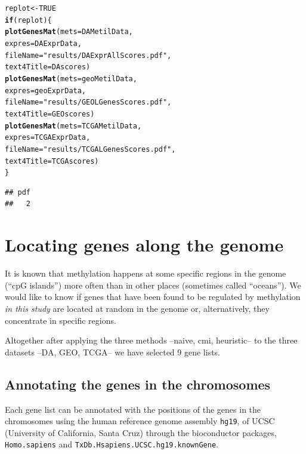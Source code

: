 \documentclass[a4paper,10pt]{article}\usepackage[]{graphicx}\usepackage[]{color}
\makeatletter
\newcommand{\hlnum}[1]{\textcolor[rgb]{0.686,0.059,0.569}{#1}}%
\newcommand{\hlstr}[1]{\textcolor[rgb]{0.192,0.494,0.8}{#1}}%
\newcommand{\hlstd}[1]{\textcolor[rgb]{0.345,0.345,0.345}{#1}}%
\newcommand{\hlkwa}[1]{\textcolor[rgb]{0.161,0.373,0.58}{\textbf{#1}}}%
\newcommand{\hlkwb}[1]{\textcolor[rgb]{0.69,0.353,0.396}{#1}}%
\newcommand{\hlkwc}[1]{\textcolor[rgb]{0.333,0.667,0.333}{#1}}%
\newcommand{\hlkwd}[1]{\textcolor[rgb]{0.737,0.353,0.396}{\textbf{#1}}}%
\newenvironment{kframe}{%
 \def\at@end@of@kframe{}%
 \ifinner\ifhmode%
  \def\at@end@of@kframe{\end{minipage}}%
  \begin{minipage}{\columnwidth}%
 \fi\fi%
 \def\FrameCommand##1{\hskip\@totalleftmargin \hskip-\fboxsep
 \colorbox{shadecolor}{##1}\hskip-\fboxsep
     \hskip-\linewidth \hskip-\@totalleftmargin \hskip\columnwidth}%
 \MakeFramed {\advance\hsize-\width
   \@totalleftmargin\z@ \linewidth\hsize
   \@setminipage}}%
 {\par\unskip\endMakeFramed%
 \at@end@of@kframe}
\newenvironment{knitrout}{}{} %
\makeatother
\begin{document}
\begin{knitrout}
\color{fgcolor}\begin{kframe}
\begin{alltt}
\hlstd{replot} \hlkwb{<-} \hlnum{TRUE}
\hlkwa{if}\hlstd{(replot)\{}
      \hlkwd{plotGenesMat} \hlstd{(}\hlkwc{mets}\hlstd{=DAMetilData,}
              \hlkwc{expres}\hlstd{=DAExprData,}
              \hlkwc{fileName} \hlstd{=} \hlstr{"results/DAExprAllScores.pdf"}\hlstd{,}
              \hlkwc{text4Title} \hlstd{= DAscores)}
      \hlkwd{plotGenesMat} \hlstd{(}\hlkwc{mets}\hlstd{=geoMetilData,}
              \hlkwc{expres}\hlstd{=geoExprData,}
              \hlkwc{fileName} \hlstd{=}\hlstr{"results/GEOLGenesScores.pdf"}\hlstd{,}
              \hlkwc{text4Title} \hlstd{= GEOscores)}
      \hlkwd{plotGenesMat} \hlstd{(}\hlkwc{mets}\hlstd{=TCGAMetilData,}
              \hlkwc{expres}\hlstd{=TCGAExprData,}
              \hlkwc{fileName} \hlstd{=} \hlstr{"results/TCGALGenesScores.pdf"}\hlstd{,}
              \hlkwc{text4Title} \hlstd{= TCGAscores)}
  \hlstd{\}}
\end{alltt}
\begin{verbatim}
## pdf 
##   2
\end{verbatim}
\end{kframe}
\end{knitrout}


\section{Locating genes along the genome}

It is known that methylation happens at some specific regions in the genome (``cpG islands'') more often than in other places (sometimes called ``oceans'').
We would like to know if genes that have been found to be regulated by methylation \emph{in this study} are located at random in the genome or, alternatively, they concentrate in specific regions.

Altogether after applying the three methods --naive, cmi, heuristic-- to the three datasets --DA, GEO, TCGA-- we have selected 9 gene lists. 

\subsection{Annotating the genes in the chromosomes}

Each gene list can be annotated with the positions of the genes in the chromosomes using the human reference genome assembly \texttt{hg19}, of UCSC (University of California, Santa Cruz) through the bioconductor packages, \texttt{Homo.sapiens} and \texttt{TxDb.Hsapiens.UCSC.hg19.knownGene}.
\end{document}
